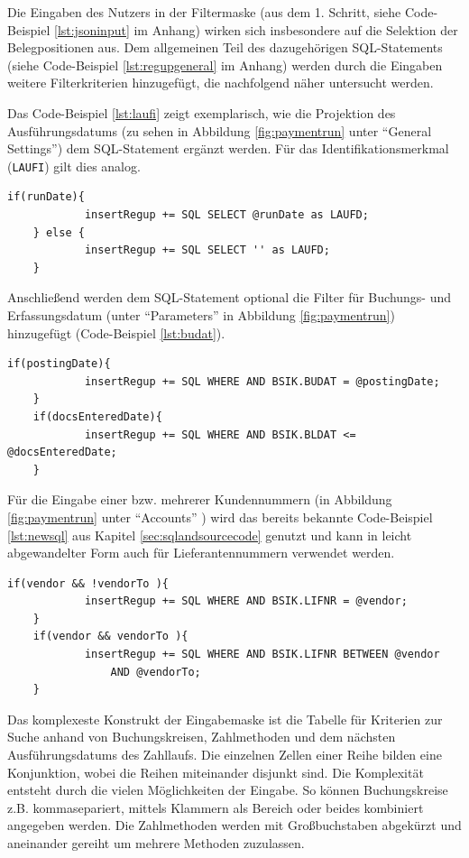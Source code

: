 Die Eingaben des Nutzers in der Filtermaske (aus dem 1. Schritt, siehe Code-Beispiel \ref{lst:jsoninput} im Anhang) wirken sich insbesondere auf die Selektion der Belegpositionen aus.
Dem allgemeinen Teil des dazugehörigen SQL-Statements (siehe Code-Beispiel \ref{lst:regupgeneral} im Anhang) werden durch die Eingaben weitere Filterkriterien hinzugefügt, die nachfolgend näher untersucht werden.

Das Code-Beispiel \ref{lst:laufi} zeigt exemplarisch, wie die Projektion des Ausführungsdatums (zu sehen in Abbildung \ref{fig:paymentrun} unter ``General Settings'') dem SQL-Statement ergänzt werden.
Für das Identifikationsmerkmal (\texttt{LAUFI}) gilt dies analog.

\begin{lstlisting}[caption={Ergänzung der Projektion um das Ausführungsdatum}, label={lst:laufi}, language=JavaScriptSQL]
	if(runDate){
			insertRegup += SQL SELECT @runDate as LAUFD;
	} else {
			insertRegup += SQL SELECT '' as LAUFD;
	}
\end{lstlisting}

Anschließend werden dem SQL-Statement optional die Filter für Buchungs- und Erfassungsdatum (unter ``Parameters'' in Abbildung \ref{fig:paymentrun}) hinzugefügt (Code-Beispiel \ref{lst:budat}).

\begin{lstlisting}[caption={Einfügen zusätzlicher Filter}, label={lst:budat}, language=JavaScriptSQL]
	if(postingDate){
			insertRegup += SQL WHERE AND BSIK.BUDAT = @postingDate;
	}
	if(docsEnteredDate){
			insertRegup += SQL WHERE AND BSIK.BLDAT <= @docsEnteredDate;
	}
\end{lstlisting}

Für die Eingabe einer bzw. mehrerer Kundennummern (in Abbildung \ref{fig:paymentrun} unter ``Accounts'' ) wird das bereits bekannte Code-Beispiel \ref{lst:newsql} aus Kapitel \ref{sec:sqlandsourcecode} genutzt und kann in leicht abgewandelter Form auch für Lieferantennummern verwendet werden.

\begin{lstlisting}[caption={Unterscheidung zwischen Einzel- und Bereichsfilter}, label={lst:vendor}, language=JavaScriptSQL]
	if(vendor && !vendorTo ){
			insertRegup += SQL WHERE AND BSIK.LIFNR = @vendor;
	}
	if(vendor && vendorTo ){
			insertRegup += SQL WHERE AND BSIK.LIFNR BETWEEN @vendor
				AND @vendorTo;
	}
\end{lstlisting}

Das komplexeste Konstrukt der Eingabemaske ist die Tabelle für Kriterien zur Suche anhand von Buchungskreisen, Zahlmethoden und dem nächsten Ausführungsdatums des Zahllaufs.
Die einzelnen Zellen einer Reihe bilden eine Konjunktion, wobei die Reihen miteinander disjunkt sind.
Die Komplexität entsteht durch die vielen Möglichkeiten der Eingabe.
So können Buchungskreise z.B. kommasepariert, mittels Klammern als Bereich oder beides kombiniert angegeben werden.
Die Zahlmethoden werden mit Großbuchstaben abgekürzt und aneinander gereiht um mehrere Methoden zuzulassen.

